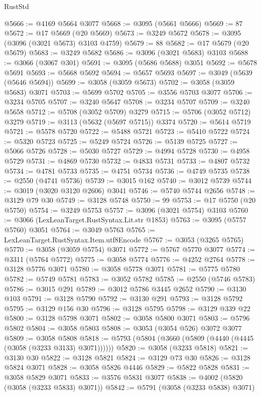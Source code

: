 \begin{lexlean}{RustStd}
\begin{coremodule}
@5666 := @4169 @5664 @3077
@5668 := @3095 (@5661 @5666)
@5669 := 87
@5672 := @17 @5669 (@20 @5669)
@5673 := @3249 @5672
@5678 := @3095 (@3096 (@3021 @5673) @3103 @4759)
@5679 := 88
@5682 := @17 @5679 (@20 @5679)
@5683 := @3249 @5682
@5686 := @3096 (@3021 @5683) @3103
@5688 := @3066 (@3067 @301)
@5691 := @3095 (@5686 @5688) @3051
@5692 := @5678 @5691
@5693 := @5668 @5692
@5694 := @5657 @5693
@5697 := @3049 (@5639 (@5646 @5694))
@5699 := @3058 (@3059 @5673)
@5702 := @3058 (@3059 @5683) @3071
@5703 := @5699 @5702
@5705 := @3556 @5703 @3077
@5706 := @3234 @5705
@5707 := @3240 @5647
@5708 := @3234 @5707
@5709 := @3240 @5658
@5712 := @5708 (@3052 @5709) @3279
@5715 := @5706 (@3052 @5712) @3279
@5719 := @3113 (@5632 (@5697 @5715)) @3374
@5720 := @5614 @5719
@5721 := @5578 @5720
@5722 := @5488 @5721
@5723 := @5410 @5722
@5724 := @5320 @5723
@5725 := @5249 @5724
@5726 := @5139 @5725
@5727 := @5066 @5726
@5728 := @5030 @5727
@5729 := @4994 @5728
@5730 := @4958 @5729
@5731 := @4869 @5730
@5732 := @4833 @5731
@5733 := @4807 @5732
@5734 := @4781 @5733
@5735 := @4751 @5734
@5736 := @4749 @5735
@5738 := @2550 (@4741 @5736)
@5739 := @3015 @162
@5740 := @3012 @5739
@5744 := @3019 (@3020 @3120 @2606) @3041
@5746 := @5740 @5744 @2656
@5748 := @3129 @79 @30
@5749 := @3128 @5748
@5750 := 99
@5753 := @17 @5750 (@20 @5750)
@5754 := @3249 @5753
@5757 := @3096 (@3021 @5754) @3103
@5760 := @3066 (LexLeanTarget.RustSyntax.Lit.str @1853)
@5763 := @3095 (@5757 @5760) @3051
@5764 := @3049 @5763
@5765 := LexLeanTarget.RustSyntax.Item.utf8Encode
@5767 := @3053 (@3265 @5765)
@5770 := @3058 (@3059 @5754) @3071
@5772 := @5767 @5770 @3077
@5774 := @3311 (@5764 @5772)
@5775 := @3058 @5774
@5776 := @4252 @2764
@5778 := @3128 @5776 @3071
@5780 := @3058 @5778 @3071
@5781 := @5775 @5780
@5782 := @5749 @5781
@5783 := @3052 @5782
@5785 := @2550 (@5746 @5783)
@5786 := @3015 @291
@5789 := @3012 @5786 @3445 @2652
@5790 := @3130 @103
@5791 := @3128 @5790
@5792 := @3130 @291
@5793 := @3128 @5792
@5795 := @3129 @156 @30
@5796 := @3128 @5795
@5798 := @3129 @339 @22
@5800 := @3128 @5798 @3071
@5802 := @3058 @5800 @3071
@5803 := @5796 @5802
@5804 := @3058 @5803
@5808 := @3053 (@3054 @526) @3072 @3077
@5809 := @3058 @5808
@5818 := @5793 (@5804 (@3660 (@5809 (@4440 (@4445 (@3058 (@3233 @3133) @3071))))))
@5820 := @3058 (@3233 @5818)
@5821 := @3130 @30
@5822 := @3128 @5821
@5824 := @3129 @73 @30
@5826 := @3128 @5824 @3071
@5828 := @3058 @5826 @4446
@5829 := @5822 @5828
@5831 := @3058 @5829 @3071
@5833 := @3576 @5831 @3077
@5838 := @4002 (@5820 (@3058 (@3233 @5833) @3071))
@5842 := @5791 (@3058 (@3233 @5838) @3071)

\end{coremodule}
\end{lexlean}

